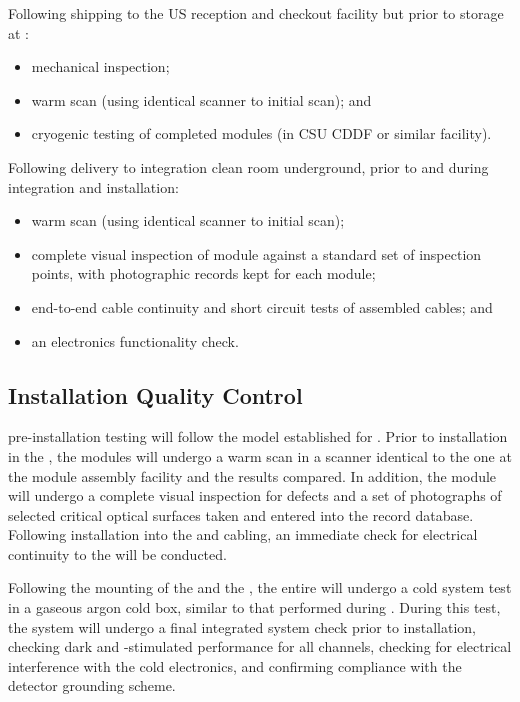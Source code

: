 Following shipping to the US reception and checkout facility but prior to storage at :
\begin{itemize}
\item mechanical inspection;
\item warm scan (using identical scanner to initial scan); and
\item cryogenic testing of completed modules (in CSU CDDF or similar facility).
\end{itemize}

Following delivery to integration clean room underground, prior to and during integration and installation:
\begin{itemize}
\item warm scan (using identical scanner to initial scan);
\item complete visual inspection of module against a standard set of inspection points, with photographic records kept for each module;
\item end-to-end cable continuity and short circuit tests of assembled cables; and
\item an  electronics functionality check.
\end{itemize}

\subsection{Installation Quality Control}
\label{sec:fdsp-pd-installqc}

 pre-installation testing will follow the model established for .  Prior to installation in the , the  modules will undergo a warm scan in a scanner identical to the one at the  module assembly facility and the results compared.  In addition, the module will undergo a complete visual inspection for defects and a set of photographs of selected critical optical surfaces taken and entered into the  record database.  Following installation into the  and cabling, an immediate check for electrical continuity to the  will be conducted.

Following the mounting of the   and the , the entire  will undergo a cold system test in a gaseous argon cold box, similar to that performed during .  During this test, the  system will undergo a final integrated system check prior to installation, checking dark and -stimulated  performance for all channels, checking for electrical interference with the cold electronics, and confirming compliance with the detector grounding scheme.